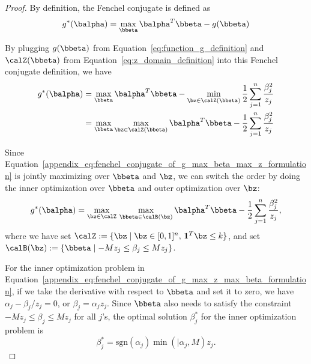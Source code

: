 \begin{proof}
    By definition, the Fenchel conjugate is defined as
    \begin{equation}
        \label{appendix_def:fenchel_conjugate_of_g}
        g^*(\balpha) = \max_{\bbeta} \balpha^T \bbeta - g(\bbeta)
    \end{equation}

    By plugging $g(\bbeta)$ from Equation~\eqref{eq:function_g_definition} and $\calZ(\bbeta)$ from Equation~\eqref{eq:z_domain_definition} into this Fenchel conjugate definition, we have
    \begin{align}
        \label{appendix_eq:fenchel_conjugate_of_g_max_beta_max_z_formulation}
            g^*(\balpha) &= \max_{\bbeta} \balpha^T \bbeta - \min_{\bz \in \calZ(\bbeta)} \frac{1}{2} \sum_{j=1}^n \frac{\beta_j^2}{z_j} \nonumber \\
            &= \max_{\bbeta} \max_{\bz \in \calZ(\bbeta)} \balpha^T \bbeta -  \frac{1}{2} \sum_{j=1}^n \frac{\beta_j^2}{z_j}
    \end{align}

    Since Equation~\eqref{appendix_eq:fenchel_conjugate_of_g_max_beta_max_z_formulation} is jointly maximizing over $\bbeta$ and $\bz$, we can switch the order by doing the inner optimization over $\bbeta$ and outer optimization over $\bz$:
    \begin{align}
        \label{appendix_eq:fenchel_conjugate_of_g_max_z_max_beta_formulation}
        g^*(\balpha) = \max_{\bz \in \calZ} \, \max_{\bbeta \in \calB(\bz)} \balpha^T \bbeta - \frac{1}{2} \sum_{j=1}^n \frac{\beta_j^2}{z_j},
    \end{align}
    where we have set $\calZ := \{\bz \mid \bz \in [0,1]^n, \, \mathbf{1}^T \bz \leq k\}$, and set $\calB(\bz) := \{\bbeta \mid - M z_j \leq \beta_j \leq M z_j\}$.

    For the inner optimization problem in Equation~\eqref{appendix_eq:fenchel_conjugate_of_g_max_z_max_beta_formulation}, if we take the derivative with respect to $\bbeta$ and set it to zero, we have $\alpha_j - \beta_j / z_j = 0$, or $\beta_j = \alpha_j z_j$.
    Since $\bbeta$ also needs to satisfy the constraint $ - M z_j \leq \beta_j \leq M z_j$ for all $j$'s, the optimal solution $\beta_j^*$ for the inner optimization problem is 
    \begin{equation}
        \label{appendix_eq:solution_for_beta_in_terms_of_fenchel_dual_alpha}
        \beta_j^* = \text{sgn}(\alpha_j) \min(\vert{\alpha_j}, M) z_j.
    \end{equation}


\end{proof}
